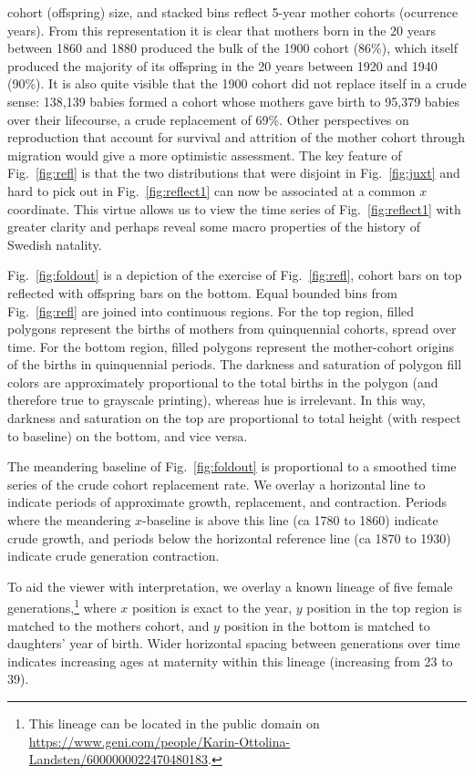 \documentclass{article}
\begin{document}
cohort (offspring) size, and stacked bins reflect 5-year mother cohorts
(ocurrence years). From this representation it is clear that mothers born in the
20 years between 1860 and 1880 produced the bulk of the 1900 cohort (86\%),
which itself produced the majority of its offspring in the 20 years between 1920
and 1940 (90\%). It is also quite visible that the 1900 cohort did not replace
itself in a crude sense: 138,139 babies formed a cohort whose mothers gave birth
to 95,379 babies over their lifecourse, a crude replacement of 69\%. Other
perspectives on reproduction that account for survival and attrition of the
mother cohort through migration would give a more optimistic assessment. The key
feature of Fig.~\ref{fig:refl} is that the two distributions that were disjoint in Fig.~\ref{fig:juxt} and hard to pick out in Fig.~\ref{fig:reflect1} can now be associated at a common $x$ coordinate. This virtue allows us to view the time series of Fig.~\ref{fig:reflect1} with greater clarity and perhaps reveal some macro properties of the history of Swedish natality.

Fig.~\ref{fig:foldout} is a depiction of the exercise of Fig.~\ref{fig:refl}, cohort bars on top reflected with offspring bars on the bottom. Equal bounded bins from Fig.~\ref{fig:refl} are joined into continuous regions. For the top region, filled polygons represent the births of mothers from quinquennial cohorts, spread over time. For the bottom region, filled polygons represent the mother-cohort origins of the births in quinquennial periods. The darkness and saturation of polygon fill colors are approximately proportional to the total births in the polygon (and therefore true to grayscale printing), whereas hue is irrelevant. In this way, darkness and saturation on the top are proportional to total height (with respect to baseline) on the bottom, and vice versa. 

The meandering baseline of Fig.~\ref{fig:foldout} is proportional to a smoothed time series of the crude cohort replacement rate. We overlay a horizontal line to indicate periods of approximate growth, replacement, and contraction. Periods where the meandering $x$-baseline is above this line (ca 1780 to 1860) indicate crude growth, and periods below the horizontal reference line (ca 1870 to 1930) indicate crude generation contraction. 

To aid the viewer with interpretation, we overlay a known lineage of five female generations,\footnote{This lineage can be located in the public domain on \url{https://www.geni.com/people/Karin-Ottolina-Landsten/6000000022470480183}.} where $x$ position is exact to the year, $y$ position in the top region is matched to the mothers cohort, and $y$ position in the bottom is matched to daughters' year of birth. Wider horizontal spacing between generations over time indicates increasing ages at maternity within this lineage (increasing from 23 to 39).
\end{document}
